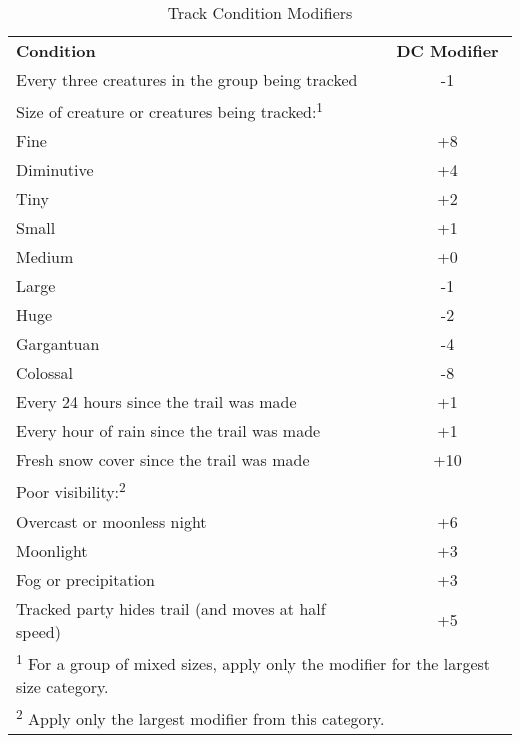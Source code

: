 \begin{table}[htb]
\caption{Track Condition Modifiers}
\centering
\begin{tabular}{l c}
\textbf{Condition}&\textbf{DC Modifier}\\
Every three creatures in the group being tracked & -1\\
Size of creature or creatures being tracked:\textsuperscript{1}&\\
\hspace{1cm}Fine & +8\\
\hspace{1cm}Diminutive & +4\\
\hspace{1cm}Tiny & +2\\
\hspace{1cm}Small & +1\\
\hspace{1cm}Medium & +0\\
\hspace{1cm}Large & -1\\
\hspace{1cm}Huge & -2\\
\hspace{1cm}Gargantuan & -4\\
\hspace{1cm}Colossal & -8\\
Every 24 hours since the trail was made & +1\\
Every hour of rain since the trail was made & +1\\
Fresh snow cover since the trail was made & +10\\
Poor visibility:\textsuperscript{2} &\\
\hspace{1cm}Overcast or moonless night & +6\\
\hspace{1cm}Moonlight & +3\\
\hspace{1cm}Fog or precipitation & +3\\
Tracked party hides trail (and moves at half speed) & +5\\
\multicolumn{2}{l}{\textsuperscript{1} For a group of mixed sizes, apply only the modifier for the largest size category.}\\
\multicolumn{2}{l}{\textsuperscript{2} Apply only the largest modifier from this category.}\\
\end{tabular}
\end{table}

